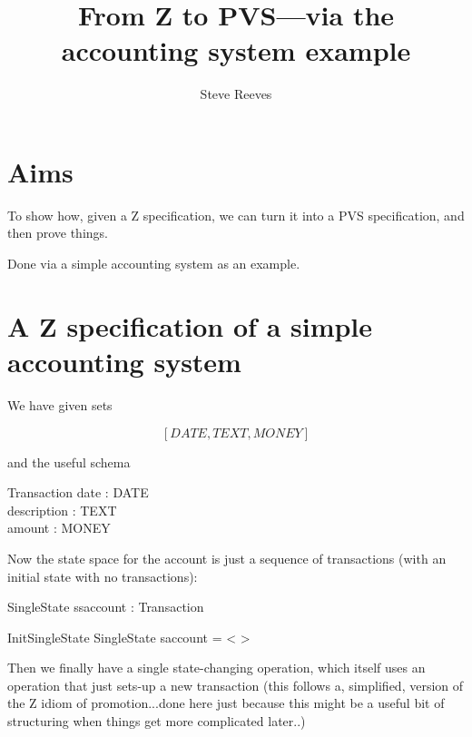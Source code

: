 \documentclass[11pt]{amsart}
\title{From Z to PVS---via the accounting system example}
\author{Steve Reeves}
\date{}                                           %
\begin{document}
\maketitle

\section{Aims}

To show how, given a Z specification, we can turn it into a PVS specification, and then prove things.

Done via a simple accounting system as an example.

\section{A Z specification of a simple accounting system}

We have given sets
 
\[
[DATE, TEXT, MONEY]
\]

and the useful schema

\begin{schema}{Transaction}
date : DATE\\
description : TEXT\\
amount : MONEY
\end{schema}

Now the state space for the account is just a sequence of transactions (with an initial state with no transactions):

\begin{schema}{SingleState}
ssaccount : \seq Transaction
\end{schema}

\begin{schema}{InitSingleState}
SingleState
\where
saccount = < >
\end{schema}

Then we finally have a single state-changing operation, which itself uses an operation that just sets-up a new transaction (this follows a, simplified, version of the Z idiom of promotion...done here just because this might be a useful bit of structuring when things get more complicated later..)
\end{document}
